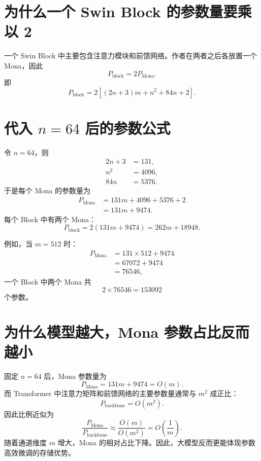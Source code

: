 \documentclass[UTF8,12pt,a4paper,fontset=none]{ctexart}
\begin{document}
\section{为什么一个 Swin Block 的参数量要乘以 2}

一个 Swin Block 中主要包含注意力模块和前馈网络。作者在两者之后各放置一个 Mona，因此
\begin{equation}
 P_{\mathrm{block}}
 =2P_{\mathrm{Mona}}.
\end{equation}
即
\begin{equation}
 \boxed{
 P_{\mathrm{block}}
 =2\left[(2n+3)m+n^2+84n+2\right]
 }.
\end{equation}

\section{代入 \texorpdfstring{$n=64$}{n=64} 后的参数公式}

令 $n=64$，则
\begin{align}
 2n+3&=131,\\
 n^2&=4096,\\
 84n&=5376.
\end{align}
于是每个 Mona 的参数量为
\begin{align}
 P_{\mathrm{Mona}}
 &=131m+4096+5376+2\\
 &=\boxed{131m+9474}.
\end{align}
每个 Block 中有两个 Mona：
\begin{equation}
 P_{\mathrm{block}}
 =2(131m+9474)
 =\boxed{262m+18948}.
\end{equation}

例如，当 $m=512$ 时：
\begin{align}
 P_{\mathrm{Mona}}
 &=131\times512+9474\\
 &=67072+9474\\
 &=76546,
\end{align}
一个 Block 中两个 Mona 共
\begin{equation}
 2\times76546=153092
\end{equation}
个参数。

\section{为什么模型越大，Mona 参数占比反而越小}

固定 $n=64$ 后，Mona 参数量为
\begin{equation}
 P_{\mathrm{Mona}}=131m+9474=O(m).
\end{equation}
而 Transformer 中注意力矩阵和前馈网络的主要参数量通常与 $m^2$ 成正比：
\begin{equation}
 P_{\mathrm{backbone}}=O(m^2).
\end{equation}
因此比例近似为
\begin{equation}
 \frac{P_{\mathrm{Mona}}}{P_{\mathrm{backbone}}}
 \approx\frac{O(m)}{O(m^2)}
 =O\left(\frac{1}{m}\right).
\end{equation}
随着通道维度 $m$ 增大，Mona 的相对占比下降。因此，大模型反而更能体现参数高效微调的存储优势。
\end{document}
